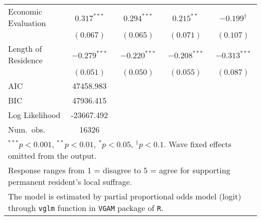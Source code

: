 \begin{table}
\begin{center}
\begin{tabular}{l c c c c }
Economic Evaluation    & $0.317^{***}$  & $0.294^{***}$  & $0.215^{**}$   & $-0.199^{\dagger}$ \\
                       & $(0.067)$      & $(0.065)$      & $(0.071)$      & $(0.107)$          \\
Length of Residence    & $-0.279^{***}$ & $-0.220^{***}$ & $-0.208^{***}$ & $-0.313^{***}$     \\
                       & $(0.051)$      & $(0.050)$      & $(0.055)$      & $(0.087)$          \\
\midrule
AIC                    & 47458.983      &                &                &                    \\
BIC                    & 47936.415      &                &                &                    \\
Log Likelihood         & -23667.492     &                &                &                    \\
Num.\ obs.             & 16326          &                &                &                    \\
\bottomrule
\multicolumn{5}{l}{\scriptsize{$^{***}p<0.001$, $^{**}p<0.01$, $^*p<0.05$, $^{\dagger}p<0.1$. Wave fixed effects omitted from the output.}} \\ \multicolumn{5}{l}{\scriptsize{Response ranges from 1 = disagree to 5 = agree for supporting permanent resident's local suffrage.}} \\ \multicolumn{5}{l}{\scriptsize{The model is estimated by partial proportional odds model (logit) through \texttt{vglm} function in \texttt{VGAM} package of \texttt{R}.}}
\end{tabular}
\label{goltab_smom}
\end{center}
\end{table}

